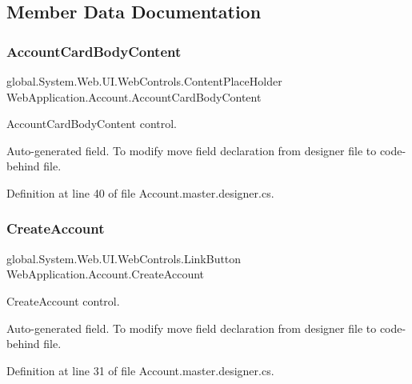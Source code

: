 \subsection{Member Data Documentation}
\mbox{\label{classWebApplication_1_1Account_ad4d7bdd1cdc63398539ccec0bac3b7fa}} 
\subsubsection{\texorpdfstring{AccountCardBodyContent}{AccountCardBodyContent}}
{\footnotesize\ttfamily global.\+System.\+Web.\+U\+I.\+Web\+Controls.\+Content\+Place\+Holder Web\+Application.\+Account.\+Account\+Card\+Body\+Content\hspace{0.3cm}{\ttfamily [protected]}}



Account\+Card\+Body\+Content control. 

Auto-\/generated field. To modify move field declaration from designer file to code-\/behind file. 

Definition at line 40 of file Account.\+master.\+designer.\+cs.

\mbox{\label{classWebApplication_1_1Account_a2459dd326051499977cd9d924025d7a9}} 
\subsubsection{\texorpdfstring{CreateAccount}{CreateAccount}}
{\footnotesize\ttfamily global.\+System.\+Web.\+U\+I.\+Web\+Controls.\+Link\+Button Web\+Application.\+Account.\+Create\+Account\hspace{0.3cm}{\ttfamily [protected]}}



Create\+Account control. 

Auto-\/generated field. To modify move field declaration from designer file to code-\/behind file. 

Definition at line 31 of file Account.\+master.\+designer.\+cs.

